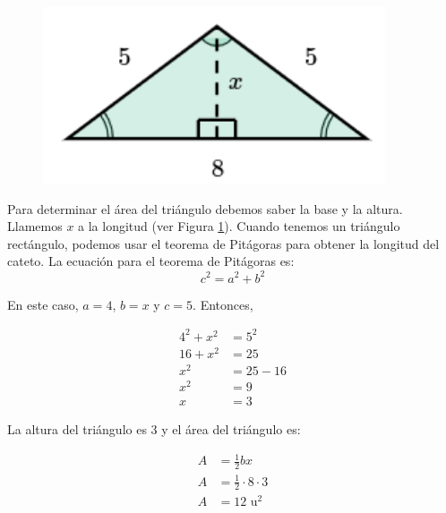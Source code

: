 \begin{solutionbox}{7cm} \footnotesize
    \begin{minipage}{0.2\textwidth}
        \begin{figure}[H]
            \centering
            \includegraphics[width=0.9\textwidth]{../images/area_isoseles_03a.png}
            \caption{}
            \label{fig:area_isoseles_03a}
        \end{figure}
    \end{minipage}%
    \begin{minipage}{0.7\textwidth}
        Para determinar el área del triángulo debemos saber la base y la altura. Llamemos $x$ a la longitud (ver Figura \ref{fig:area_isoseles_03a}).
        Cuando tenemos un triángulo rectángulo, podemos usar el teorema de Pitágoras para obtener la longitud del cateto.
        La ecuación para el teorema de Pitágoras es:
        \[c^2=a^2+b^2\]
    \end{minipage}

    \vspace{-0.5cm}
    \begin{multicols}{2}
        En este caso, $a=4$, $b=x$ y $c=5$. Entonces,

        \begin{align*}
            4^2+x^2 & =5^2   \\
            16+x^2  & =25    \\
            x^2     & =25-16 \\
            x^2     & =9     \\
            x       & =3
        \end{align*}

        La altura del triángulo es 3 y el área del triángulo es:

        \begin{align*}
            A & =\frac{1}{2}bx             \\
            A & =\frac{1}{2}\cdot 8\cdot 3 \\
            A & =12 \text{ u}^2
        \end{align*}
    \end{multicols}
\end{solutionbox}

